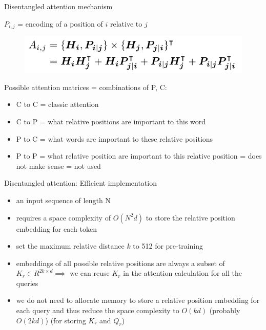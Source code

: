 \documentclass{beamer}
\begin{document}
\begin{frame}{Disentangled attention mechanism}

$P_{i,j}$ = encoding of a position of $i$ relative to $j$
\begin{figure}[h]
\includegraphics[width=\textwidth]{img/attij}
\end{figure}

Possible attention matrices = combinations of P, C:
\begin{itemize}
\item C to C = classic attention
\item C to P = what relative positions are important to this word
\item P to C = what words are important to these relative positions
\item P to P = what relative position are important to this relative position = does not make sense = not used
\end{itemize}

\end{frame}

\begin{frame}{Disentangled attention: Efficient implementation}

\begin{itemize}
\item an input sequence of length N
\item requires a space complexity of $O(N^2d)$ to store the relative position embedding for each token
\item set the maximum relative distance $k$ to 512 for pre-training
\item embeddings of all possible relative positions are always a subset of $K_r \in R^{2k \times d} \implies$ we can reuse $K_r$ in the attention calculation for all the queries
\item we do not need to allocate memory to store a relative position embedding for each query and thus reduce the space complexity to $O(kd)$ (probably $O(2kd)$) (for storing $K_r$ and $Q_r$)
\end{itemize}



\end{frame}
\end{document}
